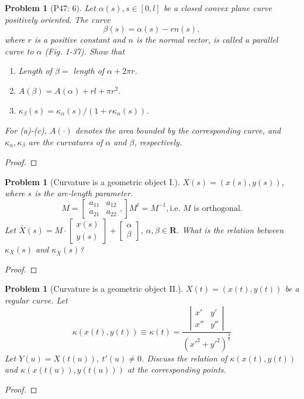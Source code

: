 \documentclass[12pt,a4paper]{article}
\newcounter{theProblemCounter}
\newtheorem{problem}[theProblemCounter]{Problem}
\begin{document}
\setcounter{theProblemCounter}{4}
\begin{problem}[P47: 6]
Let $\alpha(s), s\in [0, l]$ be a closed convex plane curve positively oriented. The curve
\[ \beta(s)=\alpha(s) - rn(s),\]
where $r$ is a positive constant and $n$ is the normal vector, is called a \emph{parallel} curve to $\alpha$ (Fig. 1-37). Show that
\begin{enumerate}
\item[(a)] Length of $\beta = $ length of $\alpha + 2\pi r$.
\item[(b)] $A(\beta)=A(\alpha)+rl+\pi r^2$.
\item[(c)] $\kappa_\beta(s) = \kappa_\alpha(s)/(1+r\kappa_\alpha(s))$.
\end{enumerate}
For (a)-(c), $A(\cdot)$ denotes the area bounded by the corresponding curve, and $\kappa_\alpha, \kappa_\beta$ are the curvatures of $\alpha$ and $\beta$, respectively.
\end{problem}
\begin{proof}

\end{proof}
\setcounter{theProblemCounter}{7}
\begin{problem}[Curvature is a geometric object I.]
$X(s)=(x(s), y(s))$, where $s$ is the arc-length parameter.
\[ M = \left[
\begin{array}{cc} a_{11} & a_{12} \\ a_{21} & a_{22} \end{array},
\right]
M^t = M^{-1}, \mbox{i.e. $M$ is orthogonal.}
\]
Let $\bar{X}(s) = M\cdot \left[\begin{array}{c} x(s)\\y(s)\end{array}\right] + \left[\begin{array}{c}\alpha \\ \beta\end{array}\right]$,  $\alpha, \beta\in \mathbf{R}$. What is the relation between $\kappa_X(s)$ and $\kappa_{\bar{X}}(s)$?
\end{problem}
\begin{proof}
\end{proof}

\begin{problem}[Curvature is a geometric object II.]
$X(t) = (x(t), y(t))$ be a regular curve. Let
\[ \kappa(x(t), y(t)) \equiv \kappa(t) = \frac{
\left|
\begin{array}{cc} x' & y' \\ x'' & y'' \end{array}
\right|
}{(x'^2+y'^2)^\frac32} \]
Let $Y(u) = X(t(u))$, $t'(u)\ne 0$. Discuss the relation of $\kappa(x(t), y(t))$ and $\kappa(x(t(u)), y(t(u)))$ at the corresponding points.
\end{problem}
\begin{proof}
\end{proof}
\end{document}
